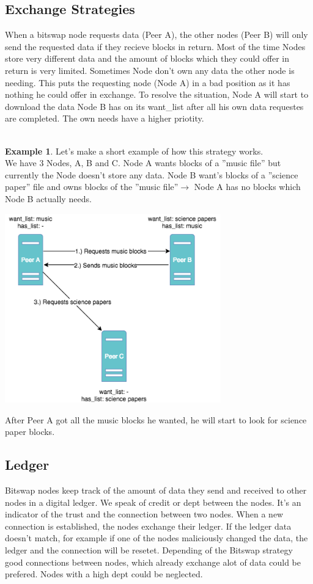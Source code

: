 \documentclass[a4paper,11pt, oneside]{report}
\theoremstyle{definition}
\newtheorem{exmp}{Example}[subsection]
\begin{document}
\subsection{Exchange Strategies}
When a bitswap node requests data (Peer A), the other nodes (Peer B) will only send the requested data if they recieve blocks in return. Most of the time Nodes store very different data and the amount of blocks which they could offer in return is very limited. Sometimes Node don't own any data the other node is needing. This puts the requesting node (Node A) in a bad position as it has nothing he could offer in exchange. To resolve the situation, Node A will start to download the data Node B has on its want\_list  after all his own data requestes are completed.  The own needs have a higher priotity.\\ \\

\newpage
\begin{exmp}
Let's make a short example of how this strategy works.\\ 
We have 3 Nodes, A, B and C. Node A wants blocks of a ''music file'' but currently the Node doesn't store any data. Node B want's blocks of a ''science paper'' file and owns blocks of the ''music file''$\rightarrow$ Node A has no blocks which Node B actually needs.
\begin{center}
\includegraphics[width=0.7\textwidth]{img/ipfs_bitswap_noblocks.png}\\[0.3cm] 
\end{center}
After Peer A got all the music blocks he wanted, he will start to look for science paper blocks.
\end{exmp}

\subsection{Ledger}
Bitswap nodes keep track of the amount of data they send and received to other nodes in a digital ledger. We speak of credit or dept between the nodes. It's an indicator of the trust and the connection between two nodes. When a new connection is established, the nodes exchange their ledger. If the ledger data doesn't match, for example if one of the nodes  maliciously changed the data, the ledger and the connection will be resetet. Depending of the Bitswap strategy good connections between nodes, which already exchange alot of data could be prefered. Nodes with a high dept could be neglected.
\end{document}
